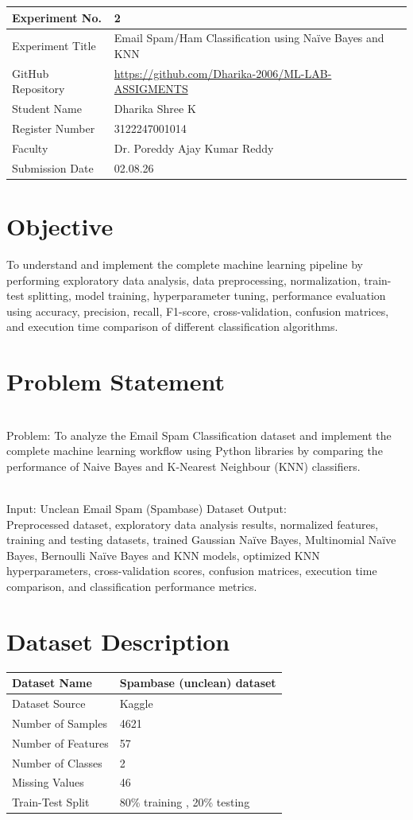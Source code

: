 \documentclass[12pt,a4paper]{article}
\begin{document}
\begin{tabular}{|p{4cm}|p{11cm}|}
\hline
Experiment No. & 2\\ \hline
Experiment Title & Email Spam/Ham Classification using Na\"ive Bayes and
KNN\\ \hline
GitHub Repository & \url{https://github.com/Dharika-2006/ML-LAB-ASSIGMENTS} \\ \hline
Student Name & Dharika Shree K\\ \hline
Register Number & 3122247001014\\ \hline
Faculty & Dr. Poreddy Ajay Kumar Reddy \\ \hline
Submission Date & 02.08.26\\ \hline
\end{tabular}

\section{Objective}
To understand and implement the complete machine learning pipeline by performing exploratory data analysis, data preprocessing, normalization, train-test splitting, model training, hyperparameter tuning, performance evaluation using accuracy, precision, recall, F1-score, cross-validation, confusion matrices, and execution time comparison of different classification algorithms.

\section{Problem Statement}
\\ Problem: To analyze the Email Spam Classification dataset and implement the complete machine learning workflow using Python libraries by comparing the performance of Naive Bayes and K-Nearest Neighbour (KNN) classifiers.

\\Input: Unclean Email Spam (Spambase) Dataset
Output:
\\ Preprocessed dataset, exploratory data analysis results, normalized features, training and testing datasets, trained Gaussian Na\"ive Bayes, Multinomial Na\"ive Bayes, Bernoulli Na\"ive Bayes and KNN models, optimized KNN hyperparameters, cross-validation scores, confusion matrices, execution time comparison, and classification performance metrics.

\section{Dataset Description}
\begin{longtable}{|p{6cm}|p{8cm}|}
\hline
Dataset Name & Spambase (unclean) dataset\\ \hline
Dataset Source & Kaggle \\ \hline
Number of Samples & 4621\\ \hline
Number of Features & 57 \\ \hline
Number of Classes & 2 \\ \hline
Missing Values & 46\\ \hline
Train-Test Split & 80\% training , 20\% testing\\ \hline
\end{longtable}
\end{document}
